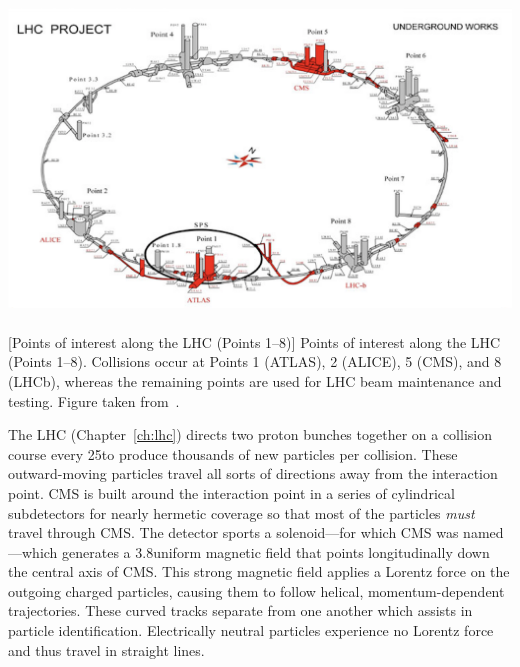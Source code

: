 \begin{multiFigure}
    \centering
    \includegraphics[height=9cm,keepaspectratio]{figures/cms/lhc_points_with_buildings.png}
        [Points of interest along the LHC (Points 1--8)]
        {Points of interest along the LHC (Points 1--8).
        Collisions occur at Points 1 (ATLAS), 2 (ALICE), 5 (CMS), and 8 (LHCb), whereas the remaining points are used for LHC beam maintenance and testing.
        Figure taken from~\cite{chatrchyan_observation_2013}. %
        } 
    \label{fig:lhc_points}
\end{multiFigure}

The LHC (Chapter~\ref{ch:lhc}) directs two proton bunches together on a collision course every 25\ns to produce thousands of new particles per \pp collision.
These outward-moving particles travel all sorts of directions away from the interaction point.
CMS is built around the interaction point in a series of cylindrical subdetectors for nearly hermetic coverage so that most of the particles \emph{must} travel through CMS.
The detector sports a solenoid---for which CMS was named---which generates a 3.8\tesla uniform magnetic field that points longitudinally down the central axis of CMS.
This strong magnetic field applies a Lorentz force on the outgoing charged particles, causing them to follow helical, momentum-dependent trajectories.
These curved tracks separate from one another which assists in particle identification.
Electrically neutral particles experience no Lorentz force and thus travel in straight lines.

